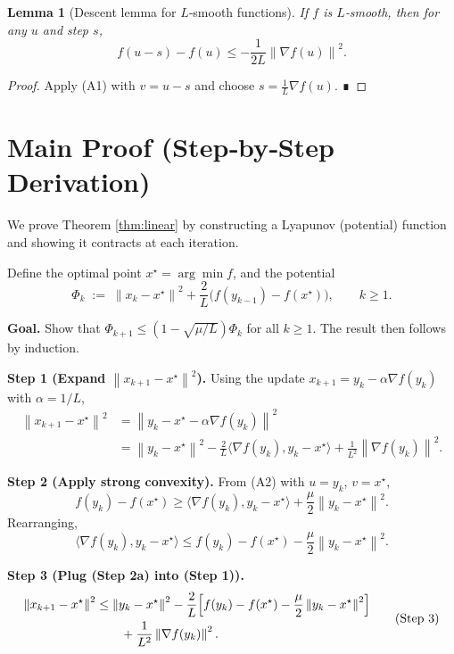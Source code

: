 \documentclass{article}
\newtheorem{lemma}{Lemma}
\newcommand{\norm}[1]{\left\|#1\right\|}
\newcommand{\ip}[2]{\langle #1,#2\rangle}
\begin{document}
\begin{lemma}[Descent lemma for $L$‑smooth functions]\label{lem:descent}
If $f$ is $L$‑smooth, then for any $u$ and step $s$,
\[
f(u-s)-f(u)\le -\frac{1}{2L}\norm{\nabla f(u)}^2 .
\tag{L2}
\]
\end{lemma}
\begin{proof}
Apply (A1) with $v=u-s$ and choose $s=\frac{1}{L}\nabla f(u)$. ∎
\end{proof}

\section*{Main Proof (Step‑by‑Step Derivation)}
We prove Theorem \ref{thm:linear} by constructing a Lyapunov (potential) function and showing it contracts at each iteration.

Define the optimal point $x^\star=\arg\min f$, and the potential
\[
\Phi_k \;:=\; \norm{x_k-x^\star}^2 + \frac{2}{L}\bigl(f(y_{k-1})-f(x^\star)\bigr),\qquad k\ge 1 .
\tag{P0}
\]

\noindent\textbf{Goal.} Show that $\Phi_{k+1}\le (1-\sqrt{\mu/L})\Phi_k$ for all $k\ge 1$. The result then follows by induction.

\medskip
\noindent\textbf{Step 1 (Expand $\norm{x_{k+1}-x^\star}^2$).}
Using the update $x_{k+1}=y_k-\alpha\nabla f(y_k)$ with $\alpha=1/L$,
\[
\begin{aligned}
\norm{x_{k+1}-x^\star}^2
&= \norm{y_k-x^\star-\alpha\nabla f(y_k)}^2 \\
&= \norm{y_k-x^\star}^2 - \frac{2}{L}\ip{\nabla f(y_k)}{y_k-x^\star}
   + \frac{1}{L^2}\norm{\nabla f(y_k)}^2 .
\end{aligned}
\tag{Step 1}
\]

\noindent\textbf{Step 2 (Apply strong convexity).}
From (A2) with $u=y_k$, $v=x^\star$,
\[
f(y_k)-f(x^\star)\ge \ip{\nabla f(y_k)}{y_k-x^\star} + \frac{\mu}{2}\norm{y_k-x^\star}^2 .
\tag{Step 2}
\]
Rearranging,
\[
\ip{\nabla f(y_k)}{y_k-x^\star}\le f(y_k)-f(x^\star)-\frac{\mu}{2}\norm{y_k-x^\star}^2 .
\tag{Step 2a}
\]

\noindent\textbf{Step 3 (Plug (Step 2a) into (Step 1)).}
\[
\begin{aligned}
\norm{x_{k+1}-x^\star}^2
&\le \norm{y_k-x^\star}^2 
   -\frac{2}{L}\Bigl[f(y_k)-f(x^\star)-\frac{\mu}{2}\norm{y_k-x^\star}^2\Bigr] \\
&\qquad +\frac{1}{L^2}\norm{\nabla f(y_k)}^2 .
\end{aligned}
\tag{Step 3}
\]
\end{document}

